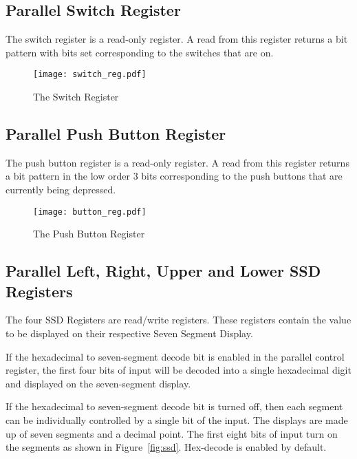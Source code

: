 \subsection{Parallel Switch Register}

The switch register is a read-only register. A read from this register
returns a bit pattern with bits set corresponding to the switches that
are on.

\begin{figure}[h]
\begin{center}
\texttt{[image: switch\_reg.pdf]}
\caption{The Switch Register}
\label{switch_reg_pic}
\end{center}
\end{figure}


\subsection{Parallel Push Button Register}

The push button register is a read-only register. A read from this
register returns a bit pattern in the low order 3 bits corresponding
to the push buttons that are currently being depressed.

\begin{figure}[h]
\begin{center}
\texttt{[image: button\_reg.pdf]}
\caption{The Push Button Register}
\label{button_reg_pic}
\end{center}
\end{figure}

\subsection{Parallel Left, Right, Upper and Lower SSD Registers}

The four SSD Registers are read/write registers. These
registers contain the value to be displayed on their respective Seven
Segment Display. 

If the hexadecimal to seven-segment decode bit is enabled in the
parallel control register, the first four bits of input will be decoded
into a single hexadecimal digit and displayed on the seven-segment display.

If the hexadecimal to seven-segment decode bit is turned off, then
each segment can be individually controlled by a single bit of the
input. The displays are made up of seven segments and a decimal point.
The first eight bits of input turn on the segments as shown in
Figure~\ref{fig:ssd}.
Hex-decode is enabled by default.

